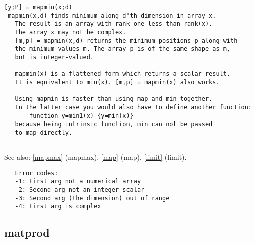\documentclass[a4paper]{article}
\begin{document}
\begin{tscreen}
\begin{verbatim}
[y;P] = mapmin(x;d)
 mapmin(x,d) finds minimum along d'th dimension in array x.
   The result is an array with rank one less than rank(x).
   The array x may not be complex.
   [m,p] = mapmin(x,d) returns the minimum positions p along with
   the minimum values m. The array p is of the same shape as m,
   but is integer-valued.

   mapmin(x) is a flattened form which returns a scalar result.
   It is equivalent to min(x). [m,p] = mapmin(x) also works.

   Using mapmin is faster than using map and min together.
   In the latter case you would also have to define another function:
       function y=min1(x) {y=min(x)}
   because being intrinsic function, min can not be passed
   to map directly. 
   
\end{verbatim}

See also: \ref{mapmax} {(mapmax)}, \ref{map} {(map)}, \ref{limit} {(limit)}.
\begin{verbatim}
   Error codes:
   -1: First arg not a numerical array
   -2: Second arg not an integer scalar
   -3: Second arg (the dimension) out of range
   -4: First arg is complex 
\end{verbatim}
\end{tscreen}





\subsection{matprod\label{matprod}}
\end{document}
